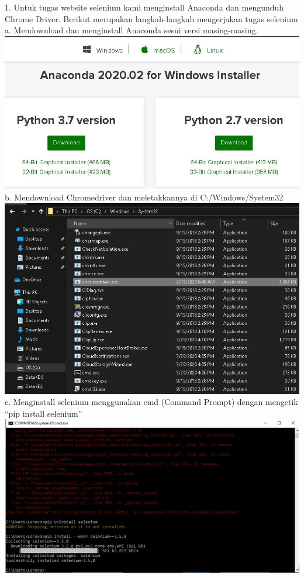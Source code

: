 \documentclass{article}
\begin{document}
        \item 1.	Untuk tugas website selenium kami menginstall Anaconda dan mengunduh Chrome Driver.
        Berikut merupakan langkah-langkah mengerjakan tugas selenium
            \newline
        a. Mendownload dan menginstall Anaconda sesui versi masing-masing.
            \newline
            \includegraphics[scale=0.5]{33.1a.jpg}
            \newline
        b. Mendownload Chromedriver dan meletakkannya di C:/Windows/System32
            \newline
            \includegraphics[scale=0.5]{33.1b.jpg}
            \newline
        c. Menginstall selenium menggunakan cmd (Command Prompt) dengan mengetik “pip install selenium”
            \newline
            \includegraphics[scale=0.5]{33.1c.jpg}
\end{document}
